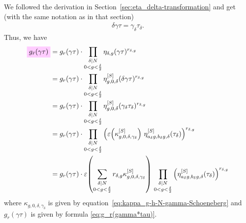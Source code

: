 \documentclass{article}
\begin{document}
We followed the derivation in
Section~\ref{sec:eta_delta-transformation} and get (with the same
notation as in that section)
\begin{gather*}
  \delta\gamma\tau = \gamma_\delta \tau_\delta.
\end{gather*}
Thus, we have
\begin{align}
  \defineNotation[g-rbar-gamma-tau]{g_{\bar{r}}(\gamma\tau)}
  &=
    g_r(\gamma\tau)
    \cdot
    \prod_{\substack{\divides{\delta}{N}\\0 < g < \frac{\delta}{2}}}
    \eta_{\delta,g}(\gamma\tau)^{r_{\delta,g}}
  \notag\\
  &=
    g_r(\gamma\tau)
    \cdot
    \prod_{\substack{\divides{\delta}{N}\\0 < g < \frac{\delta}{2}}}
    \eta_{g,0,\delta}^{[S]}(\delta\gamma\tau)^{r_{\delta,g}}
  \notag\\
  &=
    g_r(\gamma\tau)
    \cdot
    \prod_{\substack{\divides{\delta}{N}\\0 < g < \frac{\delta}{2}}}
    \eta_{g,0,\delta}^{[S]}(\gamma_\delta\tau_\delta)^{r_{\delta,g}}
  \notag\\
  &=
    g_r(\gamma\tau)
    \cdot
    \prod_{\substack{\divides{\delta}{N}\\0 < g < \frac{\delta}{2}}}
    \left(
      \unityPower{\kappa_{g,0,\delta,\gamma_\delta}^{[S]}}\,
      \eta_{a_\delta g, b_\delta g,\delta}^{[S]}(\tau_\delta)
  \right)^{r_{\delta,g}}
  \notag\\
  &=
    g_r(\gamma\tau)
    \cdot
    \unityPower{
      \sum_{\substack{\divides{\delta}{N}\\0 < g < \frac{\delta}{2}}}
        r_{\delta,g} \kappa_{g,0,\delta,\gamma_\delta}^{[S]}}\,
    \prod_{\substack{\divides{\delta}{N}\\0 < g < \frac{\delta}{2}}}
    \left(
      \eta_{a_\delta g, b_\delta g,\delta}^{[S]}(\tau_\delta)
  \right)^{r_{\delta,g}}
  \label{eq:g_rbar(gamma*tau)}
\end{align}
where $\kappa_{g,0,\delta,\gamma_\delta}$ is given by
equation~\eqref{eq:kappa_g-h-N-gamma-Schoeneberg} and
$g_r(\gamma\tau)$ is given by formula
\eqref{eq:g_r(gamma*tau)}.
\end{document}
